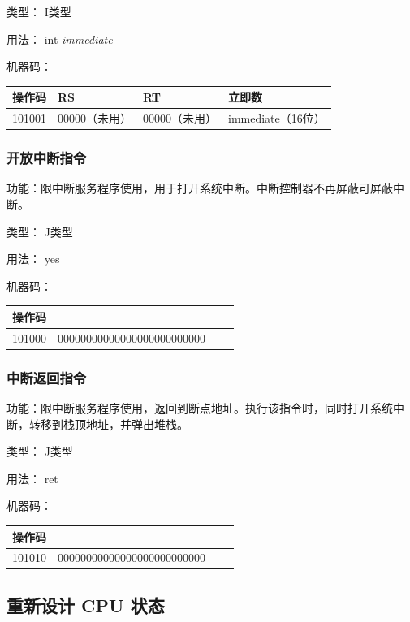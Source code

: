 \documentclass{article}
\begin{document}
类型： I类型

用法： int \emph{immediate}

机器码：

\begin{table}[!hbp]
	\begin{tabular}{|l|l|l|l|}
		\hline
		操作码 & RS & RT & 立即数 \\
		\hline
		101001 & 00000（未用） & 00000（未用） & immediate（16位）\\
		\hline
	\end{tabular}
\end{table}

\subsubsection{开放中断指令}

功能：限中断服务程序使用，用于打开系统中断。中断控制器不再屏蔽可屏蔽中断。

类型： J类型

用法： yes

机器码：

\begin{table}[!hbp]
	\begin{tabular}{|l|l|l|l|}
		\hline
		操作码 & \\
		\hline
		101000 & 00000000000000000000000000\\
		\hline
	\end{tabular}
\end{table}

\subsubsection{中断返回指令}

功能：限中断服务程序使用，返回到断点地址。执行该指令时，同时打开系统中断，转移到栈顶地址，并弹出堆栈。

类型： J类型

用法： ret

机器码：

\begin{table}[!hbp]
	\begin{tabular}{|l|l|l|l|}
		\hline
		操作码 & \\
		\hline
		101010 & 00000000000000000000000000\\
		\hline
	\end{tabular}
\end{table}

\subsection{重新设计 CPU 状态}
\end{document}
